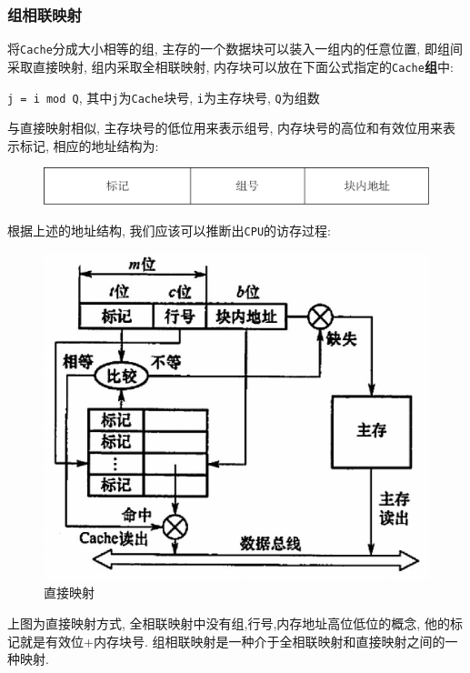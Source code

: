 \subsubsection{组相联映射}
将\verb|Cache|分成大小相等的组, 主存的一个数据块可以装入一组内的任意位置, 即组间采取直接映射, 组内采取全相联映射, 内存块可以放在下面公式指定的\verb|Cache|\textbf{组}中:
\begin{center}
\verb|j = i mod Q|, 其中\verb|j|为\verb|Cache|块号, \verb|i|为主存块号, \verb|Q|为组数
\end{center}\par 
与直接映射相似, 主存块号的低位用来表示组号, 内存块号的高位和有效位用来表示标记, 相应的地址结构为:
\begin{figure}[H]
\centering
\includegraphics[scale=.5]{img/figure14.pdf}
\end{figure}
根据上述的地址结构, 我们应该可以推断出\verb|CPU|的访存过程:
\begin{figure}[H]
\centering
\includegraphics[scale=.45]{img/figure16.png}
\caption*{直接映射}
\end{figure}\par
上图为直接映射方式, 全相联映射中没有组,行号,内存地址高位低位的概念, 他的标记就是有效位+内存块号. 组相联映射是一种介于全相联映射和直接映射之间的一种映射.
